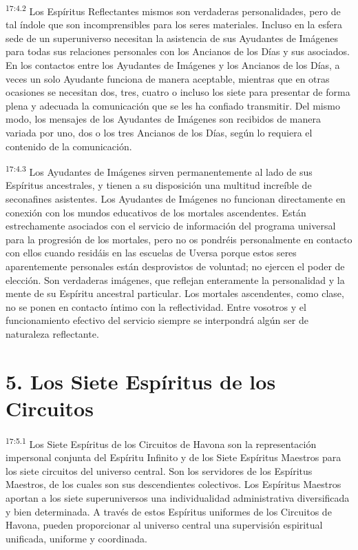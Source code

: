 \par
\textsuperscript{17:4.2} Los Espíritus Reflectantes mismos son verdaderas personalidades, pero de tal índole que son incomprensibles para los seres materiales. Incluso en la esfera sede de un superuniverso necesitan la asistencia de sus Ayudantes de Imágenes para todas sus relaciones personales con los Ancianos de los Días y sus asociados. En los contactos entre los Ayudantes de Imágenes y los Ancianos de los Días, a veces un solo Ayudante funciona de manera aceptable, mientras que en otras ocasiones se necesitan dos, tres, cuatro o incluso los siete para presentar de forma plena y adecuada la comunicación que se les ha confiado transmitir. Del mismo modo, los mensajes de los Ayudantes de Imágenes son recibidos de manera variada por uno, dos o los tres Ancianos de los Días, según lo requiera el contenido de la comunicación.

\par
\textsuperscript{17:4.3} Los Ayudantes de Imágenes sirven permanentemente al lado de sus Espíritus ancestrales, y tienen a su disposición una multitud increíble de seconafines asistentes. Los Ayudantes de Imágenes no funcionan directamente en conexión con los mundos educativos de los mortales ascendentes. Están estrechamente asociados con el servicio de información del programa universal para la progresión de los mortales, pero no os pondréis personalmente en contacto con ellos cuando residáis en las escuelas de Uversa porque estos seres aparentemente personales están desprovistos de voluntad; no ejercen el poder de elección. Son verdaderas imágenes, que reflejan enteramente la personalidad y la mente de su Espíritu ancestral particular. Los mortales ascendentes, como clase, no se ponen en contacto íntimo con la reflectividad. Entre vosotros y el funcionamiento efectivo del servicio siempre se interpondrá algún ser de naturaleza reflectante.

\section*{5. Los Siete Espíritus de los Circuitos}
\par
\textsuperscript{17:5.1} Los Siete Espíritus de los Circuitos de Havona son la representación impersonal conjunta del Espíritu Infinito y de los Siete Espíritus Maestros para los siete circuitos del universo central. Son los servidores de los Espíritus Maestros, de los cuales son sus descendientes colectivos. Los Espíritus Maestros aportan a los siete superuniversos una individualidad administrativa diversificada y bien determinada. A través de estos Espíritus uniformes de los Circuitos de Havona, pueden proporcionar al universo central una supervisión espiritual unificada, uniforme y coordinada.

